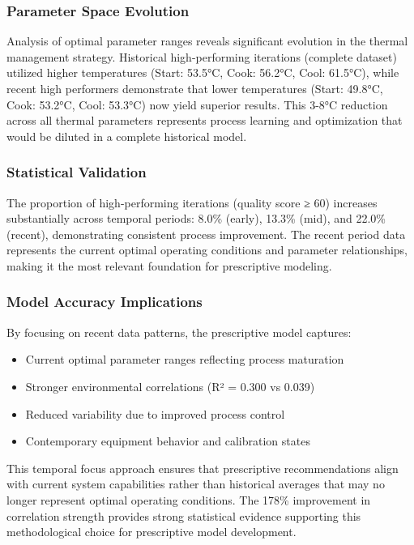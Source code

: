 \subsubsection{Parameter Space Evolution}

Analysis of optimal parameter ranges reveals significant evolution in the thermal management strategy. Historical high-performing iterations (complete dataset) utilized higher temperatures (Start: 53.5°C, Cook: 56.2°C, Cool: 61.5°C), while recent high performers demonstrate that lower temperatures (Start: 49.8°C, Cook: 53.2°C, Cool: 53.3°C) now yield superior results. This 3-8°C reduction across all thermal parameters represents process learning and optimization that would be diluted in a complete historical model.

\subsubsection{Statistical Validation}

The proportion of high-performing iterations (quality score ≥ 60) increases substantially across temporal periods: 8.0\% (early), 13.3\% (mid), and 22.0\% (recent), demonstrating consistent process improvement. The recent period data represents the current optimal operating conditions and parameter relationships, making it the most relevant foundation for prescriptive modeling.

\subsubsection{Model Accuracy Implications}

By focusing on recent data patterns, the prescriptive model captures:
\begin{itemize}
    \item Current optimal parameter ranges reflecting process maturation
    \item Stronger environmental correlations (R² = 0.300 vs 0.039)
    \item Reduced variability due to improved process control
    \item Contemporary equipment behavior and calibration states
\end{itemize}

This temporal focus approach ensures that prescriptive recommendations align with current system capabilities rather than historical averages that may no longer represent optimal operating conditions. The 178\% improvement in correlation strength provides strong statistical evidence supporting this methodological choice for prescriptive model development.